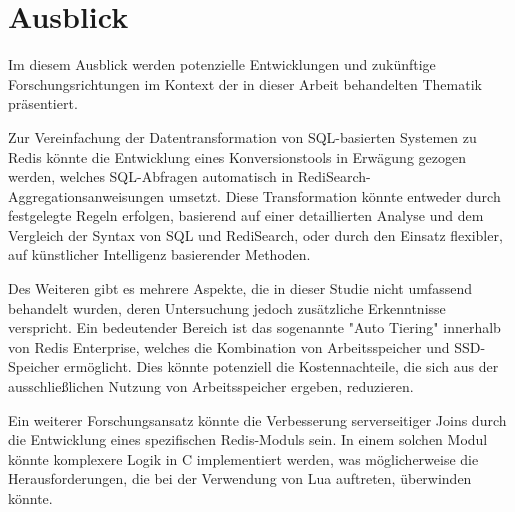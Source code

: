 \section{Ausblick}
Im diesem Ausblick werden potenzielle Entwicklungen und zukünftige Forschungsrichtungen im Kontext der in dieser Arbeit behandelten Thematik präsentiert.

Zur Vereinfachung der Datentransformation von SQL-basierten Systemen zu Redis könnte die Entwicklung eines Konversionstools in Erwägung gezogen werden, welches SQL-Abfragen automatisch in RediSearch-Aggregationsanweisungen umsetzt. Diese Transformation könnte entweder durch festgelegte Regeln erfolgen, basierend auf einer detaillierten Analyse und dem Vergleich der Syntax von SQL und RediSearch, oder durch den Einsatz flexibler, auf künstlicher Intelligenz basierender Methoden.

Des Weiteren gibt es mehrere Aspekte, die in dieser Studie nicht umfassend behandelt wurden, deren Untersuchung jedoch zusätzliche Erkenntnisse verspricht. Ein bedeutender Bereich ist das sogenannte "Auto Tiering" innerhalb von Redis Enterprise, welches die Kombination von Arbeitsspeicher und SSD-Speicher ermöglicht. Dies könnte potenziell die Kostennachteile, die sich aus der ausschließlichen Nutzung von Arbeitsspeicher ergeben, reduzieren.

Ein weiterer Forschungsansatz könnte die Verbesserung serverseitiger Joins durch die Entwicklung eines spezifischen Redis-Moduls sein. In einem solchen Modul könnte komplexere Logik in C implementiert werden, was möglicherweise die Herausforderungen, die bei der Verwendung von Lua auftreten, überwinden könnte.
